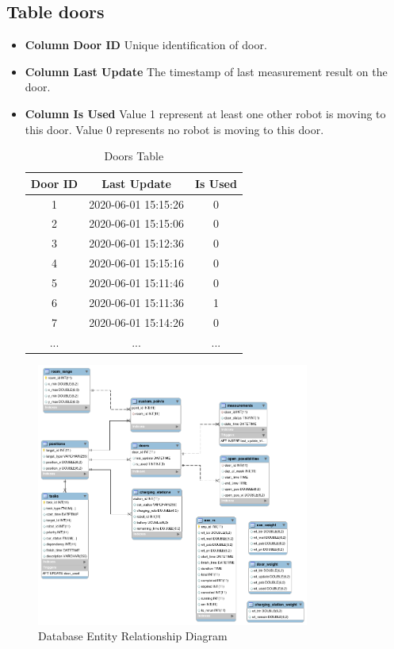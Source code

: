 \subsection*{Table doors}
\begin{itemize}
    \item \textbf{Column Door ID} Unique identification of door.
    \item \textbf{Column Last Update} The timestamp of last measurement result on the door.
    \item \textbf{Column Is Used} Value 1 represent at least one other robot is moving to this door. Value 0 represents no robot is moving to this door.
    \begin{table}[htb]
    \centering
    \begin{tabular}{|c|c|c|} 
    \hline
    Door ID & Last Update & Is Used \\ \hline
    1 & 2020-06-01 15:15:26 & 0 \\ \hline
    2 & 2020-06-01 15:15:06 & 0 \\ \hline
    3 & 2020-06-01 15:12:36 & 0 \\ \hline
    4 & 2020-06-01 15:15:16 & 0 \\ \hline
    5 & 2020-06-01 15:11:46 & 0 \\ \hline
    6 & 2020-06-01 15:11:36 & 1 \\ \hline
    7 & 2020-06-01 15:14:26 & 0 \\ \hline
    ...& ...& ... \\ \hline
    \end{tabular}
    \caption{Doors Table}
    \label{tab:db_doors}
    \end{table}
\end{itemize}


\begin{figure}[htbp]
    \centering
    \includegraphics[width = 0.8\textwidth]{content/images/ch4/database_er.png}
    \caption{Database Entity Relationship Diagram}
    \label{fig:database_er}
    \end{figure}    

